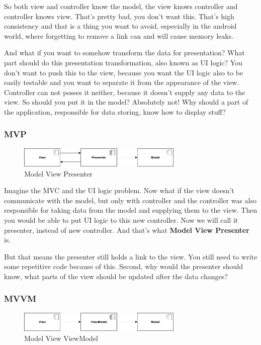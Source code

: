 So both view and controller know the model, the view knows controller and controller knows view.
That's pretty bad, you don't want this.
That's high consistency and that is a thing you want to avoid, especially in the android world, where forgetting to remove a link can and will cause memory leaks.

And what if you want to somehow transform the data for presentation?
What part should do this presentation transformation, also known as UI logic?
You don't want to push this to the view, because you want the UI logic also to be easily testable and you want to separate it from the appearance of the view.
Controller can not posses it neither, because it doesn't supply any data to the view. So should you put it in the model? Absolutely not!
Why should a part of the application, responsible for data storing, know how to display stuff?

\subsubsection{MVP}

\begin{figure}\centering
	\includegraphics[width=0.7\textwidth]{pics/patterns/bc-mvp.png}
	\caption[MVP]{Model View Presenter}\label{fig:mvp}
\end{figure}

Imagine the MVC and the UI logic problem.
Now what if the view doesn't communicate with the model, but only with controller and the controller was also responsible for taking data from the model and supplying them to the view.
Then you would be able to put UI logic to this new controller. Now we will call it presenter, instead of new controller.
And that's what \textbf{Model View Presenter} is.\cite{droidcon}

But that means the presenter still holds a link to the view. You still need to write some repetitive code because of this.\cite{mvp}
Second, why would the presenter should know, what parts of the view should be updated after the data changes?

\subsubsection{MVVM}

\begin{figure}\centering
	\includegraphics[width=0.7\textwidth]{pics/patterns/bc-mvvm.png}
	\caption[MVVM]{Model View ViewModel}\label{fig:mvvm}
\end{figure}

